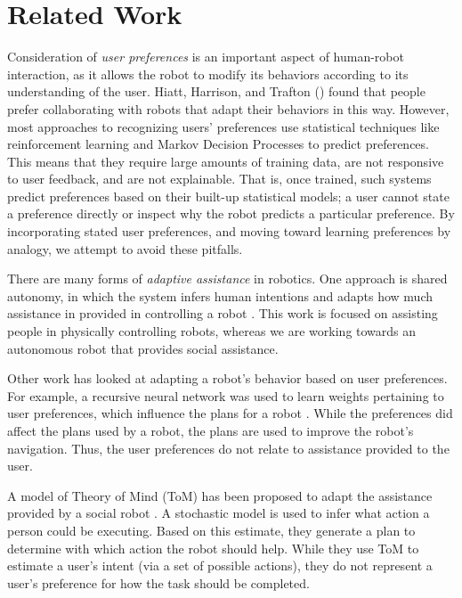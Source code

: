 \documentclass[letterpaper]{article} %
\begin{document}
\vspace{-3.02mm}
\section{Related Work}
Consideration of \textit{user preferences} is an important aspect of human-robot interaction, as it allows the robot to modify its behaviors according to its understanding of the user. Hiatt, Harrison, and Trafton (\citeyear{hiatt2011accommodating}) found that people prefer collaborating with robots that adapt their behaviors in this way. However, most approaches to recognizing users' preferences use statistical techniques like reinforcement learning \cite{woodworth2018preference} and Markov Decision Processes \cite{munzer2017preference} to predict preferences. This means that they require large amounts of training data, are not responsive to user feedback, and are not explainable. That is, once trained, such systems predict preferences based on their built-up statistical models; a user cannot state a preference directly or inspect why the robot predicts a particular preference. By incorporating stated user preferences, and moving toward learning preferences by analogy, we attempt to avoid these pitfalls.

There are many forms of \textit{adaptive assistance} in robotics.  One approach is
shared autonomy, in which the system infers human intentions and adapts how
much assistance in provided in controlling a robot \cite{Nikolaidis2017,Jain2019}.
This work is focused on assisting people in physically controlling robots,
whereas we are working towards an autonomous robot that provides social assistance.

Other work has looked at adapting a robot's behavior based on user preferences.
For example, a recursive neural network was used
to learn weights pertaining to user preferences, which influence the plans for
a robot \cite{Bacciu2014}.  While the preferences did affect the plans used by a robot,
the plans are used to improve the
robot's navigation.  Thus, the user preferences do not relate to assistance
provided to the user.

A model of Theory of Mind (ToM) has been proposed to adapt the assistance provided
by a social robot \cite{Gorur2017}.  A stochastic model is used to infer what action a person could
be executing.  Based on this estimate, they generate a plan to determine with which
action the robot should help.
While they use ToM to estimate a user's intent (via a set of possible actions),
they do not represent a user's preference for how the task should be completed.
\end{document}
